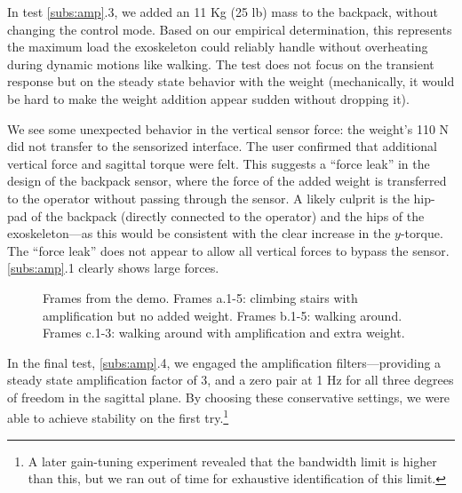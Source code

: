 \documentclass[utf8]{frontiersSCNS}
\begin{document}
In test \ref{subs:amp}.3, we added an 11 Kg (25 lb) mass to the backpack, without changing the control mode. Based on our empirical determination, this represents the maximum load the exoskeleton could reliably handle without overheating during dynamic motions like walking. The test does not focus on the transient response but on the steady state behavior with the weight (mechanically, it would be hard to make the weight addition appear sudden without dropping it).

We see some unexpected behavior in the vertical sensor force: the weight's 110 N did not transfer to the sensorized interface. The user confirmed that additional vertical force and sagittal torque were felt. This suggests a ``force leak'' in the design of the backpack sensor, where the force of the added weight is transferred to the operator without passing through the sensor. A likely culprit is the hip-pad of the backpack (directly connected to the operator) and the hips of the exoskeleton---as this would be consistent with the clear increase in the $y$-torque. The ``force leak'' does not appear to allow all vertical forces to bypass the sensor. \ref{subs:amp}.1 clearly shows large forces.

\begin{figure}[t]%
	\centering\footnotesize
	\resizebox{.9\textwidth}{!}{}
	\caption{Frames from the demo. Frames a.1-5: climbing stairs with amplification but no added weight. Frames b.1-5: walking around. Frames c.1-3: walking around with amplification and extra weight.}\label{fig:demo}
\end{figure}

In the final test, \ref{subs:amp}.4, we engaged the amplification filters---providing a steady state amplification factor of 3, and a zero pair at 1 Hz for all three degrees of freedom in the sagittal plane.
By choosing these conservative settings, we were able to achieve stability on the first try.\footnote{A later gain-tuning experiment revealed that the bandwidth limit is higher than this, but we ran out of time for exhaustive identification of this limit.}
\end{document}
